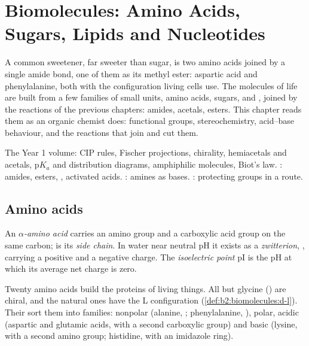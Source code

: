 \chapter{Biomolecules: Amino Acids, Sugars, Lipids and Nucleotides}\label{ch:b2:biomolecules}

A common sweetener, far sweeter than sugar, is two amino acids joined by a single amide bond, one of
them as its methyl ester: aspartic acid and phenylalanine, both with the configuration living cells
use. The molecules of life are built from a few families of small units, amino acids, sugars,  and , joined by the reactions of the previous chapters: amides, acetals, esters. This
chapter reads them as an organic chemist does: functional groups, stereochemistry, acid--base
behaviour, and the reactions that join and cut them.

\begin{recall}
The Year 1 volume: CIP rules, Fischer projections, chirality, hemiacetals and acetals, $\mathrm pK_a$
and distribution diagrams, amphiphilic molecules, Biot's law. : amides,
esters, , activated acids. : amines as bases.
: protecting groups in a route.
\end{recall}

\section{Amino acids}

\begin{definition}\label{def:b2:biomolecules:amino-acid}
An \emph{$\alpha$-amino acid}  carries an
amino group and a carboxylic acid group on the same carbon;  is its \emph{side
chain}. In water near neutral pH it exists as a \emph{zwitterion},
, carrying a positive and a negative charge. The \emph{isoelectric
point} pI is the pH at which its average net charge is zero.
\end{definition}

Twenty amino acids build the proteins of living things. All but glycine () are chiral, and
the natural ones have the L configuration (\cref{def:b2:biomolecules:d-l}). Their  sort them
into families: nonpolar (alanine, ; phenylalanine, ), polar, acidic
(aspartic and glutamic acids, with a second carboxylic group) and basic (lysine, with a second amino
group; histidine, with an imidazole ring).

